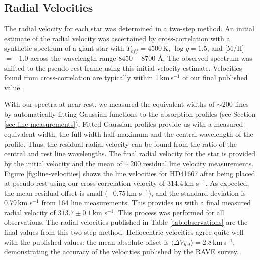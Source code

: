 \documentclass{emulateapj}
\begin{document}
\subsection{Radial Velocities}
\label{sec:radial-velocities}
The radial velocity for each star was determined in a two-step method. An initial estimate of the radial velocity was ascertained by cross-correlation with a synthetic spectrum of a giant star with $T_{eff} = 4500$\,K, $\log{g} = 1.5$, and [M/H] $= -1.0$ across the wavelength range $8450 - 8700$ \AA{}. The observed spectrum was shifted to the pseudo-rest frame using this initial velocity estimate. Velocities found from cross-correlation are typically within 1\,km\,s$^{-1}$ of our final published value.

With our spectra at near-rest, we measured the equivalent widths of $\sim$200 lines by automatically fitting Gaussian functions to the absorption profiles (see Section \ref{sec:line-measurements}). Fitted Gaussian profiles provide us with a measured equivalent width, the full-width half-maximum and the central wavelength of the profile. Thus, the residual radial velocity can be found from the ratio of the central and rest line wavelengths. The final radial velocity for the star is provided by the initial velocity and the mean of $\sim$200 residual line velocity measurements. Figure \ref{fig:line-velocities} shows the line velocities for HD41667 after being placed at pseudo-rest using our cross-correlation velocity of 314.4\,km s$^{-1}$. As expected, the mean residual offset is small ($-0.75$\,km s$^{-1}$), and the standard deviation is 0.79\,km s$^{-1}$ from 164 line measurements. This provides us with a final measured radial velocity of $313.7 \pm 0.1$\,km s$^{-1}$. This process was performed for all observations. The radial velocities published in Table \ref{tab:observations} are the final values from this two-step method. Heliocentric velocities agree quite well with the \citet{williams;et-al_2011} published values: the mean absolute offset is $\langle\Delta{V_{hel}}\rangle = 2.8$\,km\,s$^{-1}$, demonstrating the accuracy of the velocities published by the RAVE survey.
\end{document}
